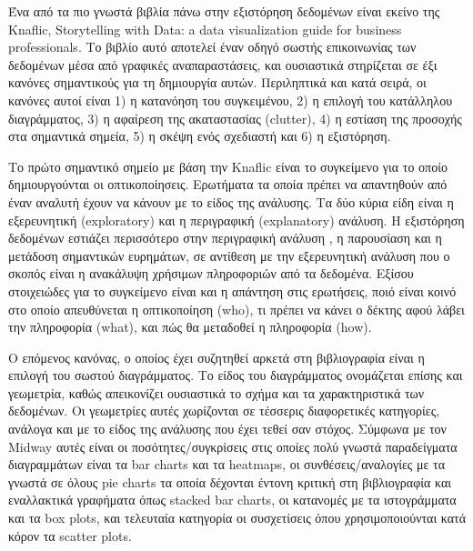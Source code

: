 \documentclass[greek, 12pt]{article}
\begin{document}
Ένα από τα πιο γνωστά βιβλία πάνω στην εξιστόρηση δεδομένων είναι εκείνο της Knaflic, Storytelling with Data: a data visualization guide for business professionals. \cite{knaflic2015storytelling} Το βιβλίο αυτό αποτελεί έναν οδηγό σωστής επικοινωνίας των δεδομένων μέσα από γραφικές αναπαραστάσεις, και ουσιαστικά στηρίζεται σε έξι κανόνες σημαντικούς για τη δημιουργία αυτών. Περιληπτικά και κατά σειρά, οι κανόνες αυτοί είναι 1) η κατανόηση του συγκειμένου, 2) η επιλογή του κατάλληλου διαγράμματος, 3) η αφαίρεση της ακαταστασίας (clutter), 4) η εστίαση της προσοχής στα σημαντικά σημεία, 5) η σκέψη ενός σχεδιαστή και 6) η εξιστόρηση.

Το πρώτο σημαντικό σημείο με βάση την Knaflic είναι το συγκείμενο για το οποίο δημιουργούνται οι οπτικοποίησεις. Ερωτήματα τα οποία πρέπει να απαντηθούν από έναν αναλυτή έχουν να κάνουν με το είδος της ανάλυσης. Τα δύο κύρια είδη είναι η εξερευνητική (exploratory) και η περιγραφική (explanatory) ανάλυση. Η εξιστόρηση δεδομένων εστιάζει περισσότερο στην περιγραφική ανάλυση \cite{echeverria2018exploratory}, η παρουσίαση και η μετάδοση σημαντικών ευρημάτων, σε αντίθεση με την εξερευνητική ανάλυση που ο σκοπός είναι η ανακάλυψη χρήσιμων πληροφοριών από τα δεδομένα. Εξίσου στοιχειώδες για το συγκείμενο είναι και η απάντηση στις ερωτήσεις, ποιό είναι κοινό στο οποίο απευθύνεται η οπτικοποίηση (who), τι πρέπει να κάνει ο δέκτης αφού λάβει την πληροφορία (what), και πώς θα μεταδοθεί η πληροφορία (how). \cite{knaflic2015storytelling}

Ο επόμενος κανόνας, ο οποίος έχει συζητηθεί αρκετά στη βιβλιογραφία είναι η επιλογή του σωστού διαγράμματος. Το είδος του διαγράμματος ονομάζεται επίσης και γεωμετρία, καθώς απεικονίζει ουσιαστικά το σχήμα και τα χαρακτηριστικά των δεδομένων. \cite{midway2020principles} Οι γεωμετρίες αυτές χωρίζονται σε τέσσερις διαφορετικές κατηγορίες, ανάλογα και με το είδος της ανάλυσης που έχει τεθεί σαν στόχος. Σύμφωνα με τον Midway αυτές είναι οι ποσότητες/συγκρίσεις στις οποίες πολύ γνωστά παραδείγματα διαγραμμάτων είναι τα bar charts και τα heatmaps, οι συνθέσεις/αναλογίες με τα γνωστά σε όλους pie charts τα οποία δέχονται έντονη κριτική στη βιβλιογραφία και εναλλακτικά γραφήματα όπως stacked bar charts, οι κατανομές με τα ιστογράμματα και τα box plots, και τελευταία κατηγορία οι συσχετίσεις όπου χρησιμοποιούνται κατά κόρον τα scatter plots.
\end{document}
